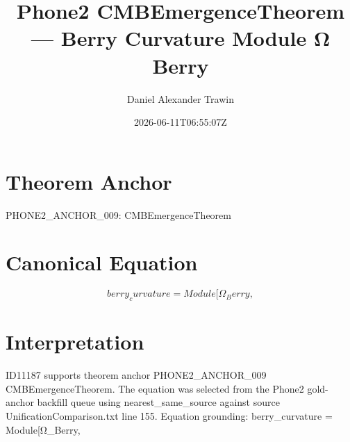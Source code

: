 \documentclass[11pt]{article}
\title{Phone2 CMBEmergenceTheorem — Berry Curvature Module Ω Berry}
\author{Daniel Alexander Trawin}
\date{2026-06-11T06:55:07Z}
\begin{document}
\maketitle
\section*{Theorem Anchor}
PHONE2_ANCHOR_009: CMBEmergenceTheorem
\section*{Canonical Equation}
\[
berry_curvature = Module[{Ω_Berry},
\]
\section*{Interpretation}
ID11187 supports theorem anchor PHONE2_ANCHOR_009 CMBEmergenceTheorem. The equation was selected from the Phone2 gold-anchor backfill queue using nearest_same_source against source UnificationComparison.txt line 155. Equation grounding: berry_curvature = Module[{Ω_Berry},
\end{document}
